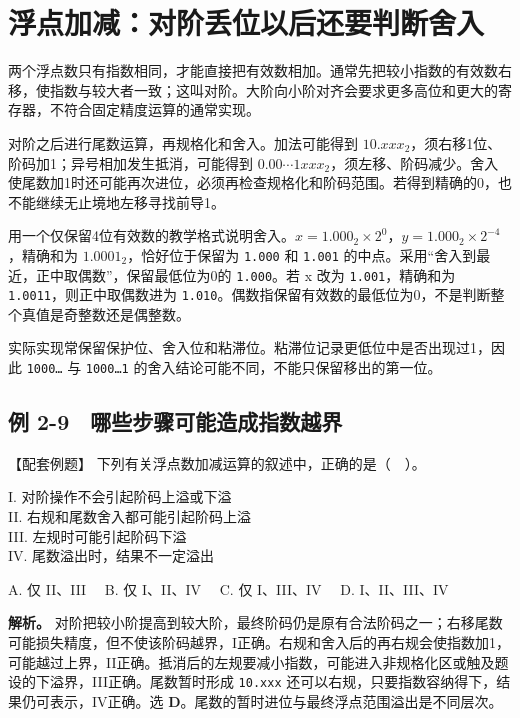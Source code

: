 \section{浮点加减：对阶丢位以后还要判断舍入}\label{CO02-21}

两个浮点数只有指数相同，才能直接把有效数相加。通常先把较小指数的有效数右移，使指数与较大者一致；这叫对阶。大阶向小阶对齐会要求更多高位和更大的寄存器，不符合固定精度运算的通常实现。

对阶之后进行尾数运算，再规格化和舍入。加法可能得到 \(10.xxx_2\)，须右移1位、阶码加1；异号相加发生抵消，可能得到 \(0.00\cdots1xxx_2\)，须左移、阶码减少。舍入使尾数加1时还可能再次进位，必须再检查规格化和阶码范围。若得到精确的0，也不能继续无止境地左移寻找前导1。

用一个仅保留4位有效数的教学格式说明舍入。\(x=1.000_2\times2^0\)，\(y=1.000_2\times2^{-4}\)，精确和为 \(1.0001_2\)，恰好位于保留为 \texttt{1.000} 和 \texttt{1.001} 的中点。采用``舍入到最近，正中取偶数''，保留最低位为0的 \texttt{1.000}。若 x 改为 \texttt{1.001}，精确和为 \texttt{1.0011}，则正中取偶数进为 \texttt{1.010}。偶数指保留有效数的最低位为0，不是判断整个真值是奇整数还是偶整数。

实际实现常保留保护位、舍入位和粘滞位。粘滞位记录更低位中是否出现过1，因此 \texttt{1000…} 与 \texttt{1000…1} 的舍入结论可能不同，不能只保留移出的第一位。

\subsection{例 2-9　哪些步骤可能造成指数越界}\label{CO02-22}

\begin{example}[配套例题]

【配套例题】 下列有关浮点数加减运算的叙述中，正确的是（　）。

I. 对阶操作不会引起阶码上溢或下溢\\
II. 右规和尾数舍入都可能引起阶码上溢\\
III. 左规时可能引起阶码下溢\\
IV. 尾数溢出时，结果不一定溢出

A. 仅 II、III　 B. 仅 I、II、IV　 C. 仅 I、III、IV　 D. I、II、III、IV

\end{example}

\textbf{解析。} 对阶把较小阶提高到较大阶，最终阶码仍是原有合法阶码之一；右移尾数可能损失精度，但不使该阶码越界，I正确。右规和舍入后的再右规会使指数加1，可能越过上界，II正确。抵消后的左规要减小指数，可能进入非规格化区或触及题设的下溢界，III正确。尾数暂时形成 \texttt{10.xxx} 还可以右规，只要指数容纳得下，结果仍可表示，IV正确。选 \textbf{D}。尾数的暂时进位与最终浮点范围溢出是不同层次。

